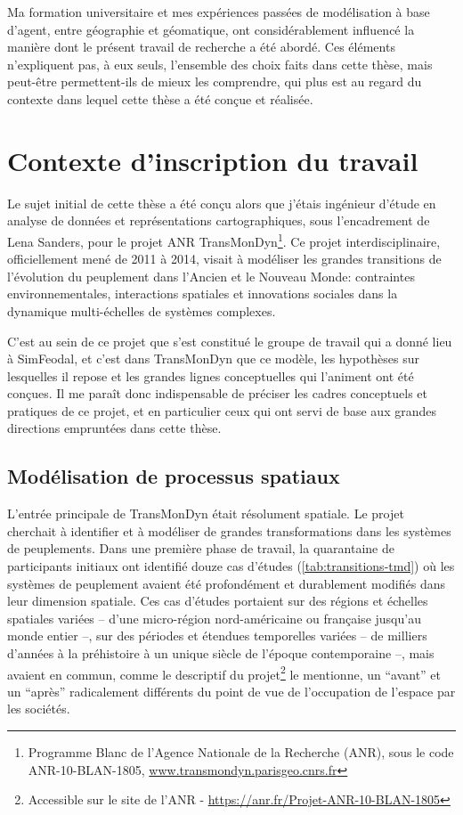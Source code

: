 Ma formation universitaire et mes expériences passées de modélisation à base d'agent, entre géographie et géomatique, ont considérablement influencé la manière dont le présent travail de recherche a été abordé.
Ces éléments n'expliquent pas, à eux seuls, l'ensemble des choix faits dans cette thèse, mais peut-être permettent-ils de mieux les comprendre, qui plus est au regard du contexte dans lequel cette thèse a été conçue et réalisée.

\section{Contexte d'inscription du travail \label{sec:contexte}}

Le sujet initial de cette thèse a été conçu alors que j'étais ingénieur d'étude en analyse de données et représentations cartographiques, sous l'encadrement de Lena Sanders, pour le projet ANR TransMonDyn\footnote{
	Programme \og Blanc\fg{} de l'Agence Nationale de la Recherche (ANR), sous le code \mbox{ANR-10-BLAN-1805}, \href{http://www.transmondyn.parisgeo.cnrs.fr/}{www.transmondyn.parisgeo.cnrs.fr}
}.
Ce projet interdisciplinaire, officiellement mené de 2011 à 2014, visait à \og modéliser les grandes transitions de l'évolution du peuplement dans l'Ancien et le Nouveau Monde: contraintes environnementales, interactions spatiales et innovations sociales dans la dynamique multi-échelles de systèmes complexes\fg{}.

C'est au sein de ce projet que s'est constitué le groupe de travail qui a donné lieu à SimFeodal, et c'est dans TransMonDyn que ce modèle, les hypothèses sur lesquelles il repose et les grandes lignes conceptuelles qui l'animent ont été conçues.
Il me paraît donc indispensable de préciser les cadres conceptuels et pratiques de ce projet, et en particulier ceux qui ont servi de base aux grandes directions empruntées dans cette thèse.

\subsection{Modélisation de processus spatiaux}

L'entrée principale de TransMonDyn était résolument spatiale.
Le projet cherchait à identifier et à modéliser de grandes transformations dans les systèmes de peuplements.
Dans une première phase de travail, la quarantaine de participants initiaux ont identifié douze cas d'études (\cref{tab:transitions-tmd}) où les systèmes de peuplement avaient été profondément et durablement modifiés dans leur dimension spatiale.
Ces cas d'études portaient sur des régions et échelles spatiales variées -- d'une micro-région nord-américaine ou française jusqu'au monde entier --, sur des périodes et étendues temporelles variées -- de milliers d'années à la préhistoire à un unique siècle de l'époque contemporaine --, mais avaient en commun, comme le descriptif du projet\footnote{
	Accessible sur le site de l'ANR - \href{https://anr.fr/Projet-ANR-10-BLAN-1805}{https://anr.fr/Projet-ANR-10-BLAN-1805}
} le mentionne, \og un “avant” et un “après” radicalement différents du point de vue de l'occupation de l'espace par les sociétés\fg{}.

